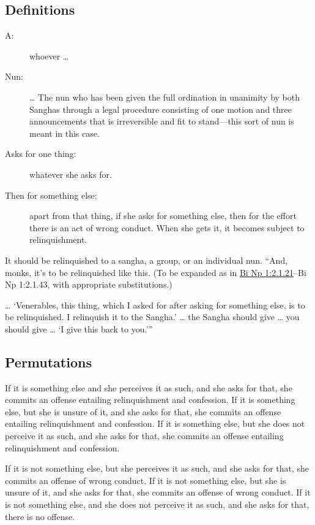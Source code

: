 \documentclass[12pt,openany]{book}%
\begin{document}
\subsection*{Definitions }

\begin{description}%
\item[A: ] whoever … %
\item[Nun: ] … The nun who has been given the full ordination in unanimity by both Sanghas through a legal procedure consisting of one motion and three announcements that is irreversible and fit to stand—this sort of nun is meant in this case. %
\item[Asks for one thing: ] whatever she asks for. %
\item[Then for something else: ] apart from that thing, if she asks for something else, then for the effort there is an act of wrong conduct. When she gets it, it becomes subject to relinquishment. %
\end{description}

It should be relinquished to a sangha, a group, or an individual nun. “And, monks, it’s to be relinquished like this. (To be expanded as in \href{https://suttacentral.net/pli-tv-bi-vb-np1/en/brahmali\#2.1.21}{Bi Np 1:2.1.21}–Bi Np 1:2.1.43, with appropriate substitutions.) 

… ‘Venerables, this thing, which I asked for after asking for something else, is to be relinquished. I relinquish it to the Sangha.’ … the Sangha should give … you should give … ‘I give this back to you.’” 

\subsection*{Permutations }

If it is something else and she perceives it as such, and she asks for that, she commits an offense entailing relinquishment and confession. If it is something else, but she is unsure of it, and she asks for that, she commits an offense entailing relinquishment and confession. If it is something else, but she does not perceive it as such, and she asks for that, she commits an offense entailing relinquishment and confession. 

If it is not something else, but she perceives it as such, and she asks for that, she commits an offense of wrong conduct. If it is not something else, but she is unsure of it, and she asks for that, she commits an offense of wrong conduct. If it is not something else, and she does not perceive it as such, and she asks for that, there is no offense. 
\end{document}
